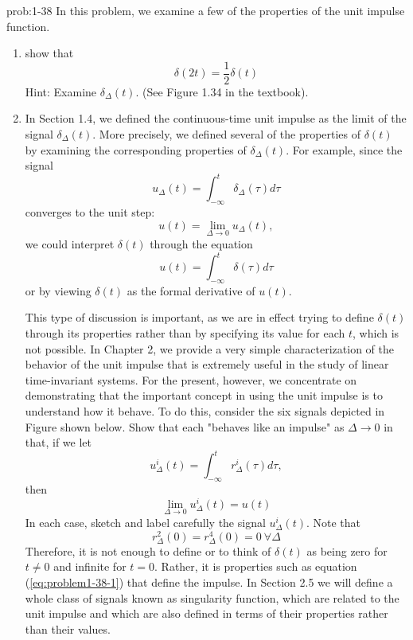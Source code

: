 \documentclass[koma,a4paper,utopia,12pt,listings-color,microtype,paralist,colorlinks,urlcolor=red]{org-article}
\begin{document}
\begin{prob}[]{prob:1-38}
In this problem, we examine a few of the properties of the unit impulse
function.
\begin{enumerate}
\item show that
\begin{equation*}
\delta(2t) = \frac{1}{2} \delta(t)
\end{equation*}
Hint: Examine \(\delta_{\Delta}(t)\). (See Figure 1.34 in the textbook).
\item In Section 1.4, we defined the continuous-time unit impulse as the limit
of the signal \(\delta_{\Delta}(t)\). More precisely, we defined several
of the properties of \(\delta(t)\) by examining the corresponding
properties of \(\delta_{\Delta}(t)\). For example, since the signal
\begin{equation*}
u_{\Delta}(t) = \int_{-\infty}^{t}\delta_{\Delta}(\tau)d\tau
\end{equation*}
converges to the unit step:
\begin{equation*}
u(t) = \lim_{\Delta\to 0} u_{\Delta}(t),
\end{equation*}
we could interpret \(\delta(t)\) through the equation
\begin{equation}
\label{eq:problem1-38-1}
u(t) = \int_{-\infty}^{t} \delta(\tau)d\tau
\end{equation}
or by viewing \(\delta(t)\) as the formal derivative of \(u(t)\).

This type of discussion is important, as we are in effect trying to
define \(\delta(t)\) through its properties rather than by specifying its
value for each \(t\), which is not possible. In Chapter 2, we provide a
very simple characterization of the behavior of the unit impulse that is
extremely useful in the study of linear time-invariant systems. For the
present, however, we concentrate on demonstrating that the important
concept in using the unit impulse is to understand how it behave. To do
this, consider the six signals depicted in Figure shown below. Show that
each "behaves like an impulse" as \(\Delta\to 0\) in that, if we let
\begin{equation*}
u_{\Delta}^{i}(t) = \int_{-\infty}^{t} r_{\Delta}^{i}(\tau)d\tau,
\end{equation*}
then
\begin{equation*}
\lim_{\Delta\to 0} u_{\Delta}^{i}(t) = u(t)
\end{equation*}
In each case, sketch and label carefully the signal
\(u_{\Delta}^{i}(t)\). Note that
\begin{equation*}
r_{\Delta}^{2}(0) = r_{\Delta}^{4}(0) = 0 \ \forall \Delta
\end{equation*}
Therefore, it is not enough to define or to think of \(\delta(t)\) as
being zero for \(t\neq 0\) and infinite for \(t=0\). Rather, it is
properties such as equation (\ref{eq:problem1-38-1}) that define the
impulse. In Section 2.5 we will define a whole class of signals known as
singularity function, which are related to the unit impulse and which are
also defined in terms of their properties rather than their values.




\end{enumerate}
\end{prob}
\end{document}
